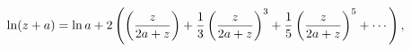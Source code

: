 \[\mathop{\ln\/}\nolimits\!\left(z+a\right)=\mathop{\ln\/}\nolimits a+2\left(%
\left(\frac{z}{2a+z}\right)+\frac{1}{3}\left(\frac{z}{2a+z}\right)^{3}+\frac{1%
}{5}\left(\frac{z}{2a+z}\right)^{5}+\cdots\right),\]